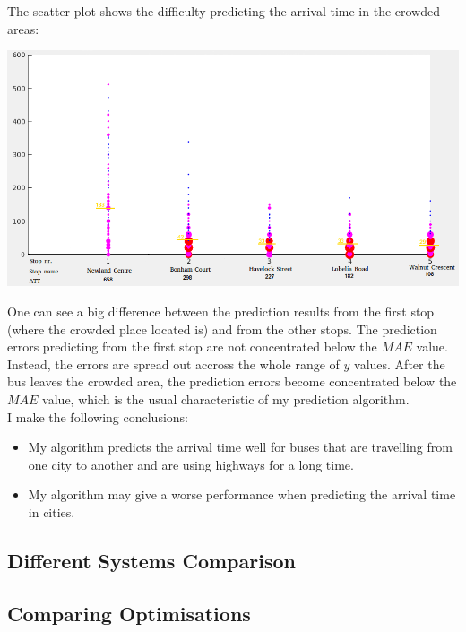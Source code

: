 \documentclass[12pt,a4paper,oneside,openright]{report}
\begin{document}
The scatter plot shows the difficulty predicting the arrival time in the crowded areas:

\includegraphics[width=\textwidth]{figs/worst_scatter_plot.png}

One can see a big difference between the prediction results from the first stop (where the
crowded place located is) and from the other stops. The prediction errors predicting from
the first stop are not concentrated below the $MAE$ value. Instead, the errors are spread out
accross the whole range of $y$ values. After the bus leaves the crowded area, the prediction
errors become concentrated below the $MAE$ value, which is the usual characteristic of my
prediction algorithm. \\

I make the following conclusions:

\begin{itemize}

    \item My algorithm predicts the arrival time well for buses that are travelling from one city
    to another and are using highways for a long time.

    \item My algorithm may give a worse performance when predicting the arrival time in cities.


\end{itemize}



\newpage

\subsection{Different Systems Comparison}

\subsection*{Comparing Optimisations}
\end{document}
